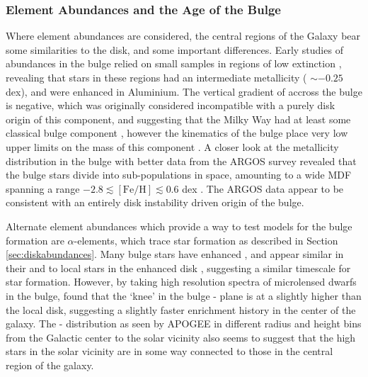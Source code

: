 \subsubsection{Element Abundances and the Age of the Bulge}
Where element abundances are considered, the central regions of the Galaxy bear some similarities to the disk, and some important differences. Early studies of abundances in the bulge relied on small samples in regions of low extinction \citep[e.g.][]{1994ApJS...91..749M}, revealing that stars in these regions had an intermediate metallicity (\feh{} $\sim -0.25$ dex), and were enhanced in Aluminium. The vertical gradient of \feh{} accross the bulge is negative, which was originally considered incompatible with a purely disk origin of this component, and suggesting that the Milky Way had at least some classical bulge component \citep[e.g.][]{2008A&A...486..177Z}, however the kinematics of the bulge place very low upper limits on the mass of this component \citep[e.g. $\sim 8\%$;][]{2010ApJ...720L..72S}. A closer look at the metallicity distribution in the bulge with better data from the ARGOS survey revealed that the bulge stars divide into sub-populations in \feh{} space, amounting to a wide MDF spanning a range $-2.8 \lesssim \mathrm{[Fe/H]}\lesssim 0.6$ dex \citep{2013MNRAS.430..836N}. The ARGOS data appear to be consistent with an entirely disk instability driven origin of the bulge.

Alternate element abundances which provide a way to test models for the bulge formation are $\alpha$-elements, which trace star formation as described in Section \ref{sec:diskabundances}. Many bulge stars have enhanced \afe{}, and appear similar in their \afe{} and \feh{} to local stars in the \afe{} enhanced disk \citep{2010A&A...513A..35A,2015A&A...584A..46G}, suggesting a similar timescale for star formation. However, by taking high resolution spectra of microlensed dwarfs in the bulge, \citet{2013A&A...549A.147B} found that the `knee' in the bulge \afe{}-\feh{} plane is at a slightly higher \feh{} than the local disk, suggesting a slightly faster enrichment history in the center of the galaxy. The \afe{}-\feh{} distribution as seen by APOGEE in different radius and height bins from the Galactic center to the solar vicinity \citep{2016PASA...33...22N} also seems to suggest that the high \afe{} stars in the solar vicinity are in some way connected to those in the central region of the galaxy.

